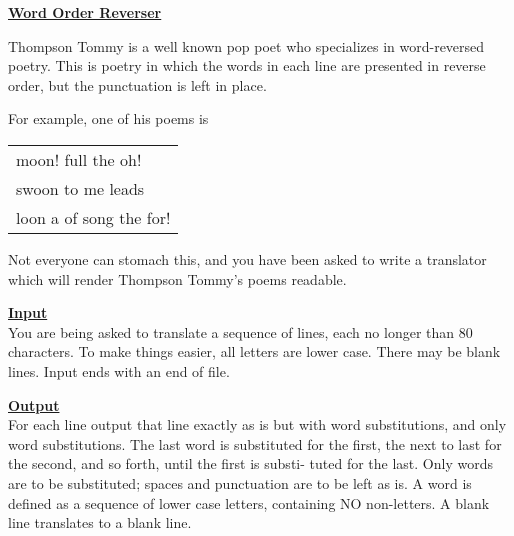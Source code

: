 \documentclass[12pt]{article}
\begin{document}
\newcommand{\problem}[1]{\underline{\Large \bf #1}}
\renewcommand{\section}[1]{\bigskip\underline{\bf #1}\\}
\newcommand{\header}[1]{\underline{\bf #1}}
\setlength{\parindent}{0.0in}
\setlength{\parskip}{1ex}

\problem{Word Order Reverser}

Thompson Tommy is a well known pop poet who specializes
in word-reversed poetry.  This is poetry in which the
words in each line are presented in reverse order, but
the punctuation is left in place.

For example, one of his poems is
\begin{center}\begin{tabular}{l}
moon! full the oh! \\
swoon to me leads \\
loon a of song the for! \\
\end{tabular}\end{center}

Not everyone can stomach this, and you have been asked
to write a translator which will render Thompson Tommy's
poems readable.


\section{Input}

You are being asked to translate a sequence of lines,
each no longer than 80 characters.  To make things
easier, all letters are lower case.  There may be blank
lines.  Input ends with an end of file.


\section{Output}

For each line output that line exactly as is but with
word substitutions, and only word substitutions.  The
last word is substituted for the first, the next to last
for the second, and so forth, until the first is substi-
tuted for the last.  Only words are to be substituted;
spaces and punctuation are to be left as is.  A word is
defined as a sequence of lower case letters, containing
NO non-letters.  A blank line translates to a blank
line.
\end{document}

